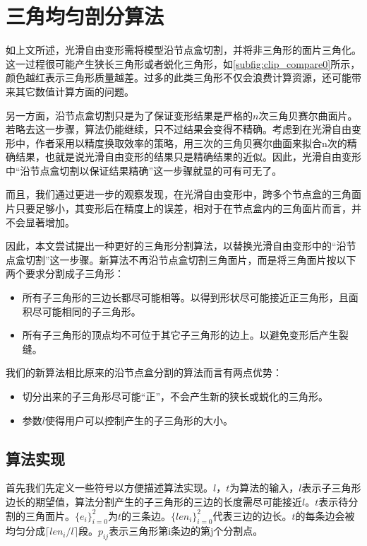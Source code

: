
\chapter{三角均匀剖分算法}
如上文所述，光滑自由变形需将模型沿节点盒切割，并将非三角形的面片三角化。这一过程很可能产生狭长三角形或者蜕化三角形，如\autoref{subfig:clip_compare0}所示，颜色越红表示三角形质量越差。过多的此类三角形不仅会浪费计算资源，还可能带来其它数值计算方面的问题。

另一方面，沿节点盒切割只是为了保证变形结果是严格的$n$次三角贝赛尔曲面片。若略去这一步骤，算法仍能继续，只不过结果会变得不精确。考虑到在光滑自由变形中，作者采用以精度换取效率的策略，用三次的三角贝赛尔曲面来拟合n次的精确结果，也就是说光滑自由变形的结果只是精确结果的近似。因此，光滑自由变形中“沿节点盒切割以保证结果精确”这一步骤就显的可有可无了。

而且，我们通过更进一步的观察发现，在光滑自由变形中，跨多个节点盒的三角面片只要足够小，其变形后在精度上的误差，相对于在节点盒内的三角面片而言，并不会显著增加。

因此，本文尝试提出一种更好的三角形分割算法，以替换光滑自由变形中的“沿节点盒切割”这一步骤。新算法不再沿节点盒切割三角面片，而是将三角面片按以下两个要求分割成子三角形：
\begin{itemize}
    \item 所有子三角形的三边长都尽可能相等。以得到形状尽可能接近正三角形，且面积尽可能相同的子三角形。
    \item 所有子三角形的顶点均不可位于其它子三角形的边上。以避免变形后产生裂缝。
\end{itemize}

我们的新算法相比原来的沿节点盒分割的算法而言有两点优势：
\begin{itemize}
        \item 切分出来的子三角形尽可能“正”，不会产生新的狭长或蜕化的三角形。
        \item 参数$l$使得用户可以控制产生的子三角形的大小。
\end{itemize}


\section{算法实现} \label{clip_algorithm}
首先我们先定义一些符号以方便描述算法实现。$l$，$t$为算法的输入，$l$表示子三角形边长的期望值，算法分割产生的子三角形的三边的长度需尽可能接近$l$。$t$表示待分割的三角面片。$\{e_i\}^{2}_{i=0}$为$t$的三条边。$\{len_i\}^{2}_{i=0}$代表三边的边长。$t$的每条边会被均匀分成$\lceil len_i/l \rceil$段。$p_{ij}$表示三角形第i条边的第j个分割点。

